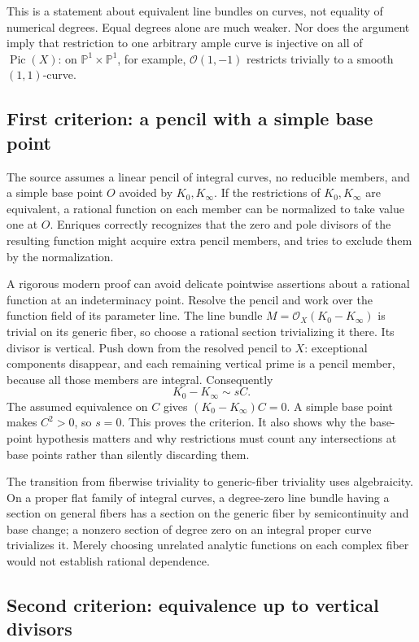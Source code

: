 This is a statement about equivalent line bundles on curves, not equality of numerical degrees. Equal degrees alone are much weaker. Nor does the argument imply that restriction to one arbitrary ample curve is injective on all of \(\operatorname{Pic}(X)\): on \(\mathbb{P}^1\times\mathbb{P}^1\), for example, \(\mathcal O(1,-1)\) restricts trivially to a smooth \((1,1)\)-curve.

\subsection{First criterion: a pencil with a simple base point}

The source assumes a linear pencil of integral curves, no reducible members, and a simple base point \(O\) avoided by \(K_0,K_\infty\). If the restrictions of \(K_0,K_\infty\) are equivalent, a rational function on each member can be normalized to take value one at \(O\). Enriques correctly recognizes that the zero and pole divisors of the resulting function might acquire extra pencil members, and tries to exclude them by the normalization.

A rigorous modern proof can avoid delicate pointwise assertions about a rational function at an indeterminacy point. Resolve the pencil and work over the function field of its parameter line. The line bundle \(M=\mathcal O_X(K_0-K_\infty)\) is trivial on its generic fiber, so choose a rational section trivializing it there. Its divisor is vertical. Push down from the resolved pencil to \(X\): exceptional components disappear, and each remaining vertical prime is a pencil member, because all those members are integral. Consequently \[
K_0-K_\infty\sim sC.
\] The assumed equivalence on \(C\) gives \((K_0-K_\infty)C=0\). A simple base point makes \(C^2>0\), so \(s=0\). This proves the criterion. It also shows why the base-point hypothesis matters and why restrictions must count any intersections at base points rather than silently discarding them.

The transition from fiberwise triviality to generic-fiber triviality uses algebraicity. On a proper flat family of integral curves, a degree-zero line bundle having a section on general fibers has a section on the generic fiber by semicontinuity and base change; a nonzero section of degree zero on an integral proper curve trivializes it. Merely choosing unrelated analytic functions on each complex fiber would not establish rational dependence.

\subsection{Second criterion: equivalence up to vertical divisors}

